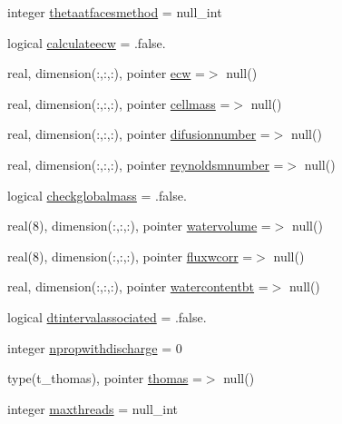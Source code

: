 \begin{DoxyCompactItemize}
\item 
integer \mbox{\hyperlink{structmoduleporousmediaproperties_1_1t__porousmediaproperties_a0e0e6347be7f55738e98619bbd9e3164}{thetaatfacesmethod}} = null\+\_\+int
\item 
logical \mbox{\hyperlink{structmoduleporousmediaproperties_1_1t__porousmediaproperties_a2156996f967422e3dd699eabfcd52e8d}{calculateecw}} = .false.
\item 
real, dimension(\+:,\+:,\+:), pointer \mbox{\hyperlink{structmoduleporousmediaproperties_1_1t__porousmediaproperties_a469a50ceecc1a777f78fb51d39685642}{ecw}} =$>$ null()
\item 
real, dimension(\+:,\+:,\+:), pointer \mbox{\hyperlink{structmoduleporousmediaproperties_1_1t__porousmediaproperties_a7a9f84166afd5e5d666763dc3089dcf2}{cellmass}} =$>$ null()
\item 
real, dimension(\+:,\+:,\+:), pointer \mbox{\hyperlink{structmoduleporousmediaproperties_1_1t__porousmediaproperties_abb0e7f752809f7d00f9b3ac2bd9cc522}{difusionnumber}} =$>$ null()
\item 
real, dimension(\+:,\+:,\+:), pointer \mbox{\hyperlink{structmoduleporousmediaproperties_1_1t__porousmediaproperties_a4cf810ccc89fb43282914e6d8bbbad8e}{reynoldsmnumber}} =$>$ null()
\item 
logical \mbox{\hyperlink{structmoduleporousmediaproperties_1_1t__porousmediaproperties_aa91fc4053240e059aeab772f2b31db06}{checkglobalmass}} = .false.
\item 
real(8), dimension(\+:,\+:,\+:), pointer \mbox{\hyperlink{structmoduleporousmediaproperties_1_1t__porousmediaproperties_af9e819aee039956a53d9b60d5f857897}{watervolume}} =$>$ null()
\item 
real(8), dimension(\+:,\+:,\+:), pointer \mbox{\hyperlink{structmoduleporousmediaproperties_1_1t__porousmediaproperties_a42c1a67aef907d898c7508e31fee0af3}{fluxwcorr}} =$>$ null()
\item 
real, dimension(\+:,\+:,\+:), pointer \mbox{\hyperlink{structmoduleporousmediaproperties_1_1t__porousmediaproperties_aca2122357ee60d1d451531c788ef6f85}{watercontentbt}} =$>$ null()
\item 
logical \mbox{\hyperlink{structmoduleporousmediaproperties_1_1t__porousmediaproperties_a9ccb7b76bd420bd5d92a0a01da2ceb30}{dtintervalassociated}} = .false.
\item 
integer \mbox{\hyperlink{structmoduleporousmediaproperties_1_1t__porousmediaproperties_a5e039862d7b4be1455542bdba09a56a3}{npropwithdischarge}} = 0
\item 
type(t\+\_\+thomas), pointer \mbox{\hyperlink{structmoduleporousmediaproperties_1_1t__porousmediaproperties_a5438cdf579672e48820cc0d6ecfa77e1}{thomas}} =$>$ null()
\item 
integer \mbox{\hyperlink{structmoduleporousmediaproperties_1_1t__porousmediaproperties_af636757fc21dabe2bf6ec0ef9f236bfe}{maxthreads}} = null\+\_\+int
\end{DoxyCompactItemize}



